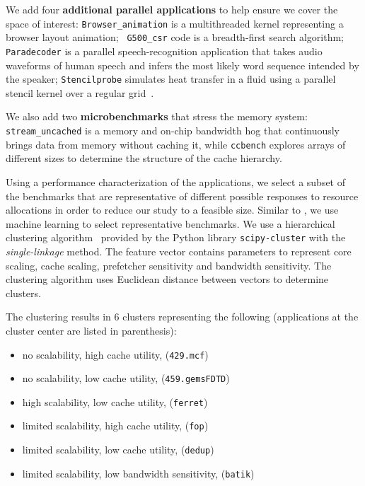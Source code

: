 We add four \textbf{additional parallel applications} to help ensure
we cover the space of interest: {\tt Browser\_animation} is a
multithreaded kernel representing a browser layout animation; {\tt
  G500\_csr} code is a breadth-first search algorithm; {\tt Paradecoder} is a parallel
speech-recognition application that takes audio waveforms of human
speech and infers the most likely word sequence intended by the
speaker; {\tt Stencilprobe} simulates heat transfer in a fluid
using a parallel stencil kernel over a regular
grid~\cite{Kamil:Stencilprobe}.

We also add two \textbf{microbenchmarks} that stress the memory
system: {\tt stream\_uncached} is a memory and on-chip bandwidth hog
that continuously brings data from memory without caching it, while
{\tt ccbench} explores arrays of different sizes to determine the
structure of the cache hierarchy.

Using a performance characterization of the applications, we select a subset of the benchmarks that are representative of different possible responses to resource allocations in order to reduce our study to a feasible size.  Similar to \cite{Phansalkar:ISCA2007}, we use machine learning to select representative benchmarks.  We use a
hierarchical clustering algorithm~\cite{Phansalkar:ISCA2007} provided by the Python library \texttt{scipy-cluster} with the \textit{single-linkage} method.  The feature vector contains parameters to represent core scaling, cache scaling, prefetcher sensitivity and bandwidth sensitivity.  The clustering algorithm uses Euclidean distance between vectors to determine clusters.

The clustering results in 6 clusters representing the following (applications at the cluster center are listed in parenthesis):
 \begin{itemize}\itemsep0pt \parskip0pt 
\item no scalability, high cache utility, ({\tt 429.mcf})
\item no scalability, low cache utility, ({\tt 459.gems\-FDTD})
\item high scalability, low cache utility, ({\tt ferret})
\item limited scalability, high cache utility, ({\tt fop})
\item limited scalability, low cache utility, ({\tt dedup})
\item limited scalability, low bandwidth sensitivity, ({\tt batik})
\end{itemize}

